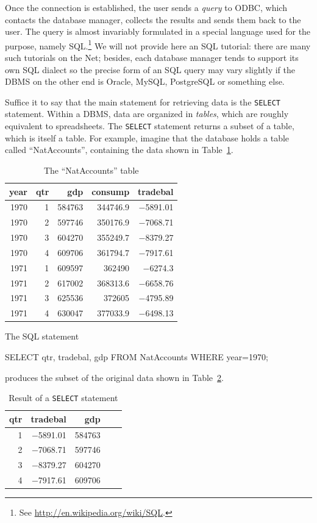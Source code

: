 Once the connection is established, the user sends a \emph{query} to
ODBC, which contacts the database manager, collects the results and
sends them back to the user. The query is almost invariably formulated
in a special language used for the purpose, namely SQL.\footnote{See
  \url{http://en.wikipedia.org/wiki/SQL}.} We will not provide here an
SQL tutorial: there are many such tutorials on the Net; besides, each
database manager tends to support its own SQL dialect so the precise
form of an SQL query may vary slightly if the DBMS on the other end is
Oracle, MySQL, PostgreSQL or something else.

Suffice it to say that the main statement for retrieving data is the
\texttt{SELECT} statement.  Within a DBMS, data are organized in
\emph{tables}, which are roughly equivalent to spreadsheets. The
\texttt{SELECT} statement returns a subset of a table, which is itself
a table. For example, imagine that the database holds a table called
``NatAccounts'', containing the data shown in
Table~\ref{tab:odbc-nataccounts}.

\begin{table}[htbp]
  \centering
  \begin{tabular}{rrrrr}
    \hline
    year	& qtr	& gdp	 & consump	& tradebal \\ 
    \hline
    1970	& 1	& 584763 & 344746.9	& $-$5891.01 \\ 
    1970	& 2	& 597746 & 350176.9	& $-$7068.71 \\ 
    1970	& 3	& 604270 & 355249.7	& $-$8379.27 \\ 
    1970	& 4	& 609706 & 361794.7	& $-$7917.61 \\ 
    1971	& 1	& 609597 & 362490	& $-$6274.3  \\ 
    1971	& 2	& 617002 & 368313.6	& $-$6658.76 \\ 
    1971	& 3	& 625536 & 372605	& $-$4795.89 \\ 
    1971	& 4	& 630047 & 377033.9	& $-$6498.13  
  \end{tabular}
  \caption{The ``NatAccounts'' table}
  \label{tab:odbc-nataccounts}
\end{table}

The SQL statement
\begin{code}
  SELECT qtr, tradebal, gdp FROM NatAccounts WHERE year=1970;
\end{code}
produces the subset of the original data shown in Table~\ref{tab:odbc-result}.

\begin{table}[htbp]
  \centering
  \begin{tabular}{rrrrr}
    \hline
    qtr	& tradebal & gdp    \\ 
    \hline
    1	& $-$5891.01 & 584763 \\ 
    2	& $-$7068.71 & 597746 \\ 
    3	& $-$8379.27 & 604270 \\ 
    4	& $-$7917.61 & 609706  
  \end{tabular}
  \caption{Result of a \texttt{SELECT} statement}
  \label{tab:odbc-result}
\end{table}

